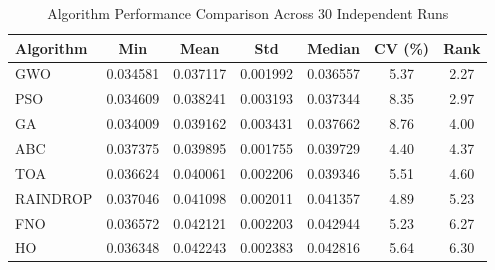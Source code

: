\begin{table}[htbp]
\centering
\caption{Algorithm Performance Comparison Across 30 Independent Runs}
\label{tab:algo_comparison}
\begin{tabular}{lcccccc}
\hline
\textbf{Algorithm} & \textbf{Min} & \textbf{Mean} & \textbf{Std} & \textbf{Median} & \textbf{CV (\%)} & \textbf{Rank} \\
\hline
GWO & 0.034581 & 0.037117 & 0.001992 & 0.036557 & 5.37 & 2.27 \\
PSO & 0.034609 & 0.038241 & 0.003193 & 0.037344 & 8.35 & 2.97 \\
GA & 0.034009 & 0.039162 & 0.003431 & 0.037662 & 8.76 & 4.00 \\
ABC & 0.037375 & 0.039895 & 0.001755 & 0.039729 & 4.40 & 4.37 \\
TOA & 0.036624 & 0.040061 & 0.002206 & 0.039346 & 5.51 & 4.60 \\
RAINDROP & 0.037046 & 0.041098 & 0.002011 & 0.041357 & 4.89 & 5.23 \\
FNO & 0.036572 & 0.042121 & 0.002203 & 0.042944 & 5.23 & 6.27 \\
HO & 0.036348 & 0.042243 & 0.002383 & 0.042816 & 5.64 & 6.30 \\
\hline
\end{tabular}
\end{table}